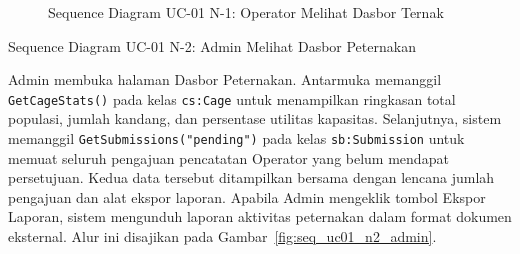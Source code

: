 \begin{figure}[htbp]
\centering
{}
\caption{Sequence Diagram UC-01 N-1: Operator Melihat Dasbor Ternak}
\label{fig:seq_uc01_n1_operator}
\end{figure}

\newpage

\item{Sequence Diagram UC-01 N-2: Admin Melihat Dasbor Peternakan}

Admin membuka halaman Dasbor Peternakan. Antarmuka memanggil
\texttt{GetCageStats()} pada kelas \texttt{cs:Cage} untuk menampilkan
ringkasan total populasi, jumlah kandang, dan persentase utilitas kapasitas.
Selanjutnya, sistem memanggil \texttt{GetSubmissions("pending")} pada kelas
\texttt{sb:Submission} untuk memuat seluruh pengajuan pencatatan Operator
yang belum mendapat persetujuan. Kedua data tersebut ditampilkan bersama
dengan lencana jumlah pengajuan dan alat ekspor laporan. Apabila Admin
mengeklik tombol Ekspor Laporan, sistem mengunduh laporan aktivitas
peternakan dalam format dokumen eksternal. Alur ini disajikan pada
Gambar~\ref{fig:seq_uc01_n2_admin}.

